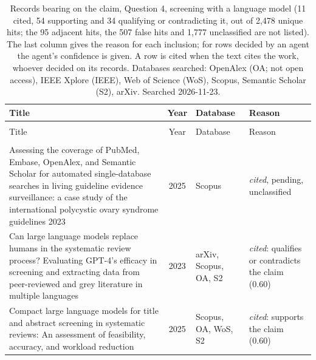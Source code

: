 
\begingroup\footnotesize
\begin{longtable}{@{}%
  >{\raggedright\arraybackslash}p{}c%
  >{\raggedright\arraybackslash}p{}%
  >{\raggedright\arraybackslash}p{}@{}}
\caption{Records bearing on the claim, Question 4, screening with a language model (11 cited, 54 supporting and 34 qualifying or contradicting it, out of 2,478 unique hits; the 95 adjacent hits, the 507 false hits and 1,777 unclassified are not listed). The last column gives the reason for each inclusion; for rows decided by an agent the agent's confidence is given. A row is cited when the text cites the work, whoever decided on its records. Databases searched: OpenAlex (OA; not open access), IEEE Xplore (IEEE), Web of Science (WoS), Scopus, Semantic Scholar (S2), arXiv. Searched 2026-11-23.}\label{tab:screenlit-q4}\\
\toprule
Title & Year & Database & Reason \\
\midrule
\endfirsthead
\multicolumn{4}{@{}l}{\emph{\tablename~\thetable{} (cont.)}}\\
\toprule
Title & Year & Database & Reason \\
\midrule
\endhead
\midrule \multicolumn{4}{r@{}}{\emph{continued on next page}}\\
\endfoot
\bottomrule
\endlastfoot
Assessing the coverage of PubMed, Embase, OpenAlex, and Semantic Scholar for automated single-database searches in living guideline evidence surveillance: a case study of the international polycystic ovary syndrome guidelines 2023 & 2025 & Scopus & \emph{cited}, pending, unclassified \\
Can large language models replace humans in the systematic review process? Evaluating GPT-4's efficacy in screening and extracting data from peer-reviewed and grey literature in multiple languages & 2023 & arXiv, Scopus, OA, S2 & \emph{cited}: qualifies or contradicts the claim (0.60) \\
Compact large language models for title and abstract screening in systematic reviews: An assessment of feasibility, accuracy, and workload reduction & 2025 & Scopus, OA, WoS, S2 & \emph{cited}: supports the claim (0.60) \\

\end{longtable}

